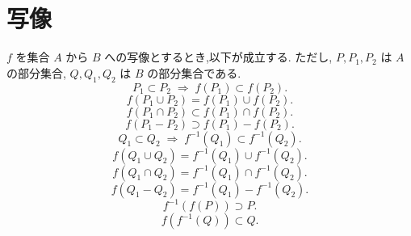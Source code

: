 \section{写像}


\begin{framed}
    \begin{thm}
        $f$ を集合 $A$ から $B$ への写像とするとき,以下が成立する.
        ただし, $P,P_1,P_2$ は $A$ の部分集合, $Q,Q_1,Q_2$ は $B$ の部分集合である.
        \begin{equation}P_1\subset P_2\;\Longrightarrow\;f(P_1)\subset f(P_2).\label{thm::map-subset}\end{equation}
        \begin{equation}f\left(P_1\cup P_2\right)=f(P_1)\cup f(P_2).\label{thm::map-cup}\end{equation}
        \begin{equation}f\left(P_1\cap P_2\right)\subset f(P_1)\cap f(P_2).\label{thm::map-cap}\end{equation}
        \begin{equation}f\left(P_1-P_2\right)\supset f(P_1)-f(P_2).\label{thm::map-sub}\end{equation}
        \begin{equation}Q_1\subset Q_2\;\Longrightarrow\;f^{-1}(Q_1)\subset f^{-1}(Q_2).\label{thm::inv-map-subset}\end{equation}
        \begin{equation}f\left(Q_1\cup Q_2\right)=f^{-1}(Q_1)\cup f^{-1}(Q_2).\label{thm::inv-map-cup}\end{equation}
        \begin{equation}f\left(Q_1\cap Q_2\right)=f^{-1}(Q_1)\cap f^{-1}(Q_2).\label{thm::inv-map-cap}\end{equation}
        \begin{equation}f\left(Q_1-Q_2\right)=f^{-1}(Q_1)-f^{-1}(Q_2).\label{thm::inv-map-sub}\end{equation}
        \begin{equation}f^{-1}(f(P))\supset P.\label{thm::map-domain}\end{equation}
        \begin{equation}f(f^{-1}(Q))\subset Q.\label{thm::map-codomain}\end{equation}
    \end{thm}
\end{framed}

